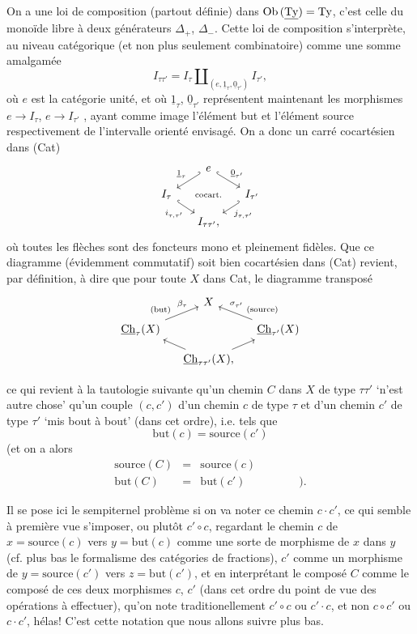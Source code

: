 On a une loi de composition (partout définie) dans $\mathrm{Ob}\,(\underline{\mathrm{Ty}}) = \mathrm{Ty}$, c'est celle du monoïde libre à deux générateurs $\Delta_+$, $\Delta_-$. Cette loi de composition s'interprète, au niveau catégorique (et non plus seulement combinatoire) comme une somme amalgamée
\[
I_{\tau\tau'} = I_\tau \amalg_{(e, \underline{1}_\tau, \underline{0}_{\tau'})} I_{\tau'},
\]
où $e$ est la catégorie unité, et où $\underline{1}_\tau$, $\underline{0}_{\tau'}$ représentent maintenant les morphismes $e \longrightarrow I_\tau$, $e \longrightarrow I_{\tau'}$ , ayant comme image l'élément but et l'élément source respectivement de l'intervalle orienté envisagé. On a donc un carré cocartésien dans (Cat)
\[
\begin{tikzcd}[column sep=small, row sep=small]
 & e \arrow[dl, hook', "\underline{1}_\tau"'] \arrow[dr, hook, "\underline{0}_{\tau'}"] & \\
I_\tau \arrow[dr, hook, "i_{\tau,\tau'}"'] & \text{\scriptsize cocart.} & I_{\tau'} \arrow[dl, hook', "j_{\tau,\tau'}"] \\
 & I_{\tau\tau'}, &
\end{tikzcd}
\]
où toutes les flèches sont des foncteurs mono et pleinement fidèles. Que ce diagramme (évidemment commutatif) soit bien cocartésien dans (Cat) revient, par définition, à dire que pour toute $X$ dans Cat, le diagramme transposé
\[
\begin{tikzcd}[column sep=small, row sep=small]
 & X & \\
\uCh_\tau(X) \arrow[ur, "\beta_\tau" near end, "\text{\scriptsize (but)}" near start] & & \uCh_{\tau'}(X) \arrow[ul, "\sigma_{\tau'}"' near end, "\text{\scriptsize (source)}"' near start] \\
 & \uCh_{\tau\tau'}(X), \arrow[ul] \arrow[ur] &
\end{tikzcd}
\]



ce qui revient à la tautologie suivante qu'un chemin $C$ dans $X$ de type $\tau\tau'$ `n'est autre chose' qu'un couple $(c,c')$ d'un chemin $c$ de type $\tau$ et d'un chemin $c'$ de type $\tau'$ `mis bout à bout' (dans cet ordre), i.e. tels que
\[
\mathrm{but}(c) = \mathrm{source}(c')
\]
(et on a alors
\[
\begin{array}{rcll}
\mathrm{source}(C) & = & \mathrm{source}(c) & \\[1ex]
\mathrm{but}(C) & = & \mathrm{but}(c') & \qquad\quad ).
\end{array}
\]

Il se pose ici le sempiternel problème si on va noter ce chemin $c{\cdot}c'$, ce qui semble à première vue s'imposer, ou plutôt $c' \circ c$, regardant le chemin $c$ de $x = \mathrm{source}(c)$ vers $y = \mathrm{but}(c)$ comme une sorte de morphisme de $x$ dans $y$ (cf. plus bas le formalisme des catégories de fractions), $c'$ comme un morphisme de $y = \mathrm{source}(c')$ vers $z = \mathrm{but}(c')$, et en interprétant le composé $C$ comme le composé de ces deux morphismes $c$, $c'$ (dans cet ordre du point de vue des opérations à effectuer), qu'on note traditionellement $c' \circ c$ ou $c' \cdot c$, et non $c \circ c'$ ou $c \cdot c'$, hélas! C'est cette notation que nous allons suivre plus bas. %

